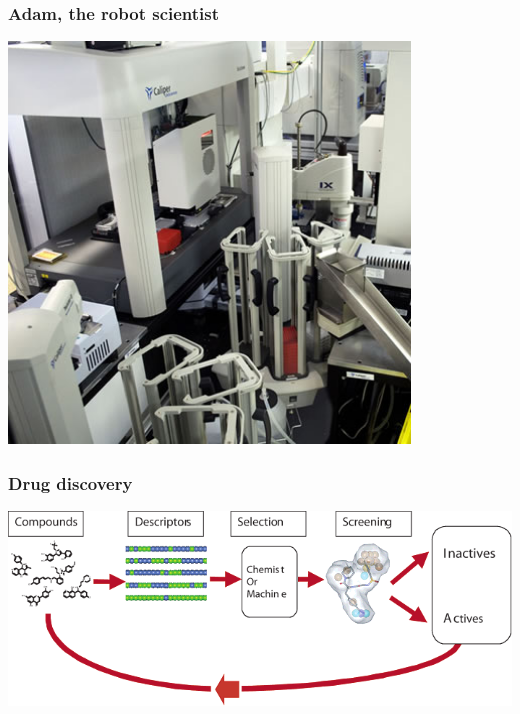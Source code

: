 \documentclass{beamer}
\begin{document}
\begin{frame}
  \frametitle{Adam, the robot scientist}
  \centering
  \includegraphics[width=0.8\textwidth]{figures/robot-scientist}
\end{frame}



\begin{frame}
  \frametitle{Drug discovery}
  \centering
  \includegraphics[width=\columnwidth]{figures/drug-discovery-000}
\end{frame}
\end{document}
